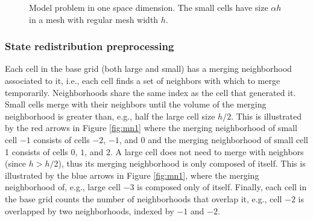 \begin{figure}
		\hfill
		\caption{\sf Model problem in one space dimension. The small
			cells have size $\alpha h$ in a mesh with regular mesh width $h$.}
		\label{fig:modelProblem1}
\end{figure}

\subsubsection*{State redistribution preprocessing}
Each cell in the base grid (both large and small) has a merging neighborhood associated to it, i.e., each cell finds a set of neighbors with which to merge temporarily.
Neighborhoods share the same index as the cell that generated it.
Small cells merge with their neighbors until the volume of the merging neighborhood is greater than, e.g., half the large cell size $h/2$.
This is illustrated by the red arrows in Figure \ref{fig:mn1} where the merging neighborhood of small cell $-1$ consists of cells $-2$, $-1$, and $0$ and the merging neighborhood of small cell 1 consists of cells $0$, $1$, and $2$. 
A large cell does not need to merge with neighbors (since $h > h/2$), thus its merging neighborhood is only composed of itself.  This is illustrated by the blue arrows in Figure \ref{fig:mn1}, where the merging neighborhood of, e.g., large cell $-3$ is composed only of itself.
Finally, each cell in the base grid counts the number of neighborhoods that overlap it, e.g., cell $-2$ is overlapped by two neighborhoods, indexed by $-1$ and $-2$.


